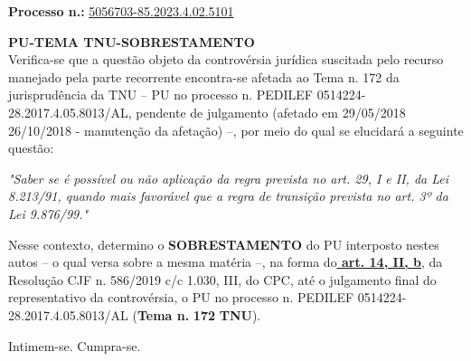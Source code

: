 \documentclass[12pt]{article}
\begin{document}
\justifying
\noindent \textbf{Processo n.: }\uline{5056703-85.2023.4.02.5101}

{\Large\bfseries \textbf{PU-TEMA TNU-SOBRESTAMENTO}}\\

\noindent Verifica-se que a questão objeto da controvérsia jurídica suscitada pelo recurso manejado pela parte recorrente encontra-se afetada ao Tema n. 172 da jurisprudência da TNU – PU no processo n. PEDILEF 0514224-28.2017.4.05.8013/AL, pendente de julgamento (afetado em 29/05/2018 26/10/2018 - manutenção da afetação) –, por meio do qual se elucidará a seguinte questão:

\noindent \textit{"Saber se é possível ou não aplicação da regra prevista no art. 29, I e II, da Lei 8.213/91, quando mais favorável que a regra de transição prevista no art. 3º da Lei 9.876/99."}

\noindent Nesse contexto, determino o \textbf{SOBRESTAMENTO} do PU interposto nestes autos – o qual versa sobre a mesma matéria –, na forma do\textbf{\uline{ art. 14, II, b}}, da Resolução CJF n. 586/2019 c/c 1.030, III, do CPC, até o julgamento final do representativo da controvérsia, o PU no processo n. PEDILEF 0514224-28.2017.4.05.8013/AL (\textbf{Tema n. }\textbf{172 }\textbf{TNU}).

\noindent Intimem-se. Cumpra-se.
\end{document}
